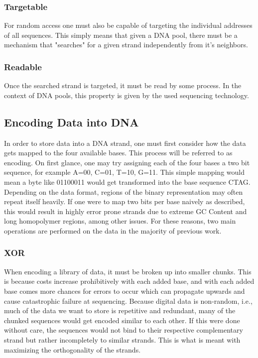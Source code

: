 \documentclass[a4paper,conference]{IEEEtran}
\begin{document}
\subsubsection{Targetable}
For random access one must also be capable of targeting the individual addresses of all sequences. This simply means that given a DNA pool, there must be a mechanism that "searches" for a given strand independently from it's neighbors.
\subsubsection{Readable}
Once the searched strand is targeted, it must be read by some process. In the context of DNA pools, this property is given by the used sequencing technology.






\subsection{Encoding Data into DNA}
In order to store data into a DNA strand, one must first consider how the data gets mapped to the four available bases. This process will be referred to as encoding. On first glance, one may try assigning each of the four bases a two bit sequence, for example A=00, C=01, T=10, G=11. This simple mapping would mean a byte like 01100011 would get transformed into the base sequence CTAG. Depending on the data format, regions of the binary representation may often repeat itself heavily. If one were to map two bits per base naively as described, this would result in highly error prone strands due to extreme GC Content and long homopolymer regions, among other issues. For these reasons, two main operations are performed on the data in the majority of previous work.

\subsubsection{XOR}
When encoding a library of data, it must be broken up into smaller chunks. This is because costs increase prohibitively with each added base, and with each added base comes more chances for errors to occur which can propagate upwards and cause catastrophic failure at sequencing. Because digital data is non-random, i.e., much of the data we want to store is repetitive and redundant, many of the chunked sequences would get encoded similar to each other. If this were done without care, the sequences would not bind to their respective complementary strand but rather incompletely to similar strands. This is what is meant with maximizing the orthogonality of the strands.
\end{document}
